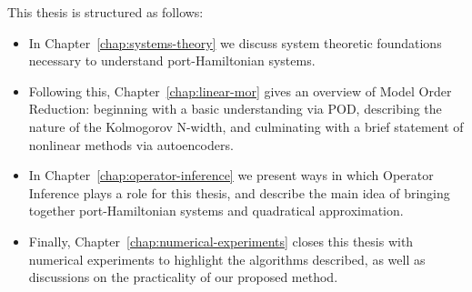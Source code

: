 This thesis is structured as follows:
\begin{itemize}
    \item In Chapter~\ref{chap:systems-theory} we discuss system theoretic foundations necessary to understand port-Hamiltonian systems.
    \item Following this, Chapter~\ref{chap:linear-mor} gives an overview of Model Order Reduction: beginning with a basic understanding via POD, describing the nature of the Kolmogorov N-width, and culminating with a brief statement of nonlinear methods via autoencoders.
    \item In Chapter~\ref{chap:operator-inference} we present ways in which Operator Inference plays a role for this thesis, and describe the main idea of bringing together port-Hamiltonian systems and quadratical approximation.
    \item Finally, Chapter~\ref{chap:numerical-experiments} closes this thesis with numerical experiments to highlight the algorithms described, as well as discussions on the practicality of our proposed method.
\end{itemize}
